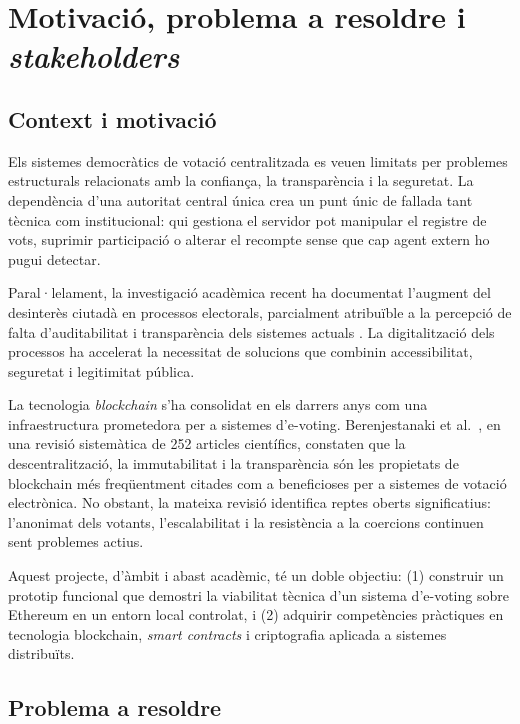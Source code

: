 \documentclass[12pt,a4paper,catalan]{article}
\begin{document}
\tableofcontents
\newpage

\section{Motivació, problema a resoldre i \textit{stakeholders}}

\subsection{Context i motivació}

Els sistemes democràtics de votació centralitzada es veuen limitats per problemes estructurals relacionats amb la confiança, la transparència i la seguretat. La dependència d'una autoritat central única crea un punt únic de fallada tant tècnica com institucional: qui gestiona el servidor pot manipular el registre de vots, suprimir participació o alterar el recompte sense que cap agent extern ho pugui detectar.

Paral·lelament, la investigació acadèmica recent ha documentat l'augment del desinterès ciutadà en processos electorals, parcialment atribuïble a la percepció de falta d'auditabilitat i transparència dels sistemes actuals \cite{vladucu2023}. La digitalització dels processos ha accelerat la necessitat de solucions que combinin accessibilitat, seguretat i legitimitat pública.

La tecnologia \textit{blockchain} s'ha consolidat en els darrers anys com una infraestructura prometedora per a sistemes d'e-voting. Berenjestanaki et al.\ \cite{berenjestanaki2024}, en una revisió sistemàtica de 252 articles científics, constaten que la descentralització, la immutabilitat i la transparència són les propietats de blockchain més freqüentment citades com a beneficioses per a sistemes de votació electrònica. No obstant, la mateixa revisió identifica reptes oberts significatius: l'anonimat dels votants, l'escalabilitat i la resistència a la coercions continuen sent problemes actius.

Aquest projecte, d'àmbit i abast acadèmic, té un doble objectiu: (1) construir un prototip funcional que demostri la viabilitat tècnica d'un sistema d'e-voting sobre Ethereum en un entorn local controlat, i (2) adquirir competències pràctiques en tecnologia blockchain, \textit{smart contracts} i criptografia aplicada a sistemes distribuïts.

\subsection{Problema a resoldre}
\end{document}
